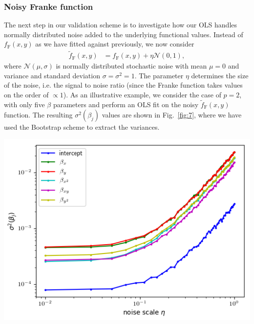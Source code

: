 \documentclass[a4paper]{article}
\newcommand{\fig}[1]{Fig.\ \ref{fig:#1}}
\newenvironment{Figure}
  {\par\medskip\noindent\minipage{\linewidth}}
  {\endminipage\par\medskip}
\begin{document}
\begin{multicols}{2}
\subsubsection{Noisy Franke function}
The next step in our validation scheme is to investigate how our OLS handles normally distributed noise added to the underlying functional values. Instead of $f_\text{F}(x,y)$ as we have fitted against previously, we now consider
\begin{align}
\tilde{f}_\text{F}(x,y) &= f_\text{F}(x,y) + \eta \mathcal{N}(0,1),
\end{align}
where $\mathcal{N}(\mu,\sigma)$ is normally distributed stochastic noise with mean $\mu=0$ and variance and standard deviation $\sigma=\sigma^2=1$. The parameter $\eta$ determines the size of the noise, i.e. the signal to noise ratio (since the Franke function takes values on the order of $\propto 1$). As an illustrative example, we consider the case of $p=2$, with only five $\beta$ parameters and perform an OLS fit on the noisy $\tilde{f}_\text{F}(x,y)$ function. The resulting $\sigma^2(\beta_j)$ values are shown in \fig{7}, where we have used the Bootstrap scheme to extract the variances. 

\begin{Figure}
\centering
\includegraphics[width=\linewidth]{beta_variance_OLS_noise.png}
\end{Figure}


\end{multicols}
\end{document}
